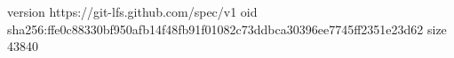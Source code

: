 version https://git-lfs.github.com/spec/v1
oid sha256:ffe0c88330bf950afb14f48fb91f01082c73ddbca30396ee7745ff2351e23d62
size 43840
